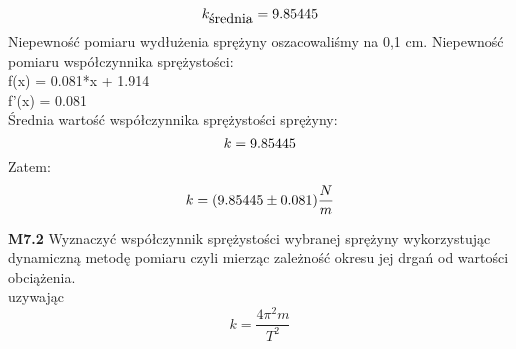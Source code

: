\documentclass[11pt,a4paper]{article}
\begin{document}
    
    \[k_{\mbox{średnia}} = \pgfmathparse{(9.81*0.050320/0.05 + 9.81*0.100342/0.10 + 9.81*0.150596/0.15 + 9.81*0.200861/0.20) /4}\pgfmathresult\]
    Niepewność pomiaru wydłużenia sprężyny oszacowaliśmy na 0,1 cm.
    Niepewność pomiaru współczynnika sprężystości:
    \\f(x) = 0.081*x + 1.914 \\
    f'(x) = 0.081 \\
    Średnia wartość współczynnika sprężystości sprężyny:
    \[ k = \pgfmathparse{(9.81*0.050320/0.05 + 9.81*0.100342/0.10 + 9.81*0.150596/0.15 + 9.81*0.200861/0.20) /4}\pgfmathresult\]
    Zatem: 
    \[ k = (\pgfmathparse{(9.81*0.050320/0.05 + 9.81*0.100342/0.10 + 9.81*0.150596/0.15 + 9.81*0.200861/0.20) /4}\pgfmathresult \pm  0.081) \frac{N}{m} \]

    \pagebreak
    \textbf{M7.2} Wyznaczyć współczynnik sprężystości wybranej sprężyny wykorzystując
    dynamiczną metodę pomiaru czyli mierząc zależność okresu jej drgań od wartości obciążenia. \\
    
    
    uzywając \[ k = \frac{4 \pi ^2 m}{T^2} \]
    
\end{document}
